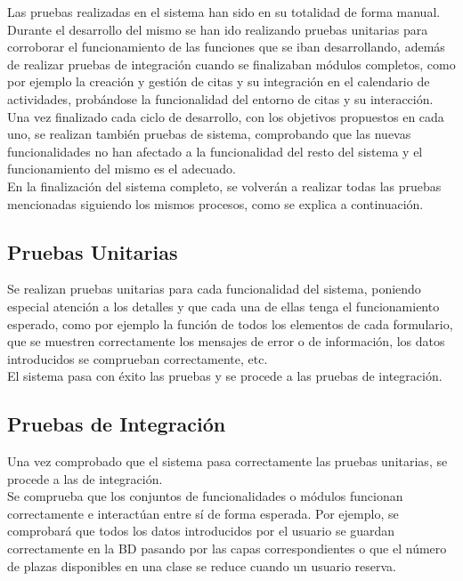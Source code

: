 Las pruebas realizadas en el sistema han sido en su totalidad de forma manual. \\

Durante el desarrollo del mismo se han ido realizando pruebas unitarias para corroborar el funcionamiento de las funciones que se iban desarrollando, además de realizar pruebas de integración cuando se finalizaban módulos completos, como por ejemplo la creación y gestión de citas y su integración en el calendario de actividades, probándose la funcionalidad del entorno de citas y su interacción.\\ 

Una vez finalizado cada ciclo de desarrollo, con los objetivos propuestos en cada uno, se realizan también pruebas de sistema, comprobando que las nuevas funcionalidades no han afectado a la funcionalidad del resto del sistema y el funcionamiento del mismo es el adecuado.\\ 

En la finalización del sistema completo, se volverán a realizar todas las pruebas mencionadas siguiendo los mismos procesos, como se explica a continuación.


\subsection{Pruebas Unitarias}

Se realizan pruebas unitarias para cada funcionalidad del sistema, poniendo especial atención a los detalles y que cada una de ellas tenga el funcionamiento esperado, como por ejemplo la función de todos los elementos de cada formulario, que se muestren correctamente los mensajes de error o de información, los datos introducidos se comprueban correctamente, etc. \\ 

El sistema pasa con éxito las pruebas y se procede a las pruebas de integración.


\subsection{Pruebas de Integración}

Una vez comprobado que el sistema pasa correctamente las pruebas unitarias, se procede a las de integración. \\

Se comprueba que los conjuntos de funcionalidades o módulos funcionan correctamente e interactúan entre sí de forma esperada. Por ejemplo, se comprobará que todos los datos introducidos por el usuario se guardan correctamente en la BD pasando por las capas correspondientes o que el número de plazas disponibles en una clase se reduce cuando un usuario reserva.\\

